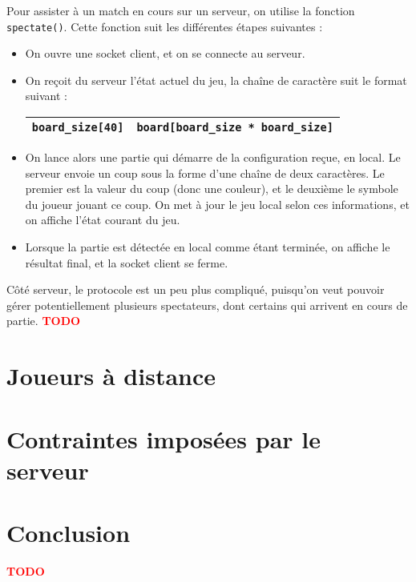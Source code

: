 \documentclass[a4paper]{article}
\newcommand{\TODO}{\textcolor{red}{\textbf{TODO}}}
\begin{document}
Pour assister à un match en cours sur un serveur, on utilise la fonction \texttt{spectate()}. Cette fonction suit les différentes étapes suivantes :

%
\begin{itemize}
	\setlength\itemsep{1em}
	\item On ouvre une socket client, et on se connecte au serveur.
	\item On reçoit du serveur l'état actuel du jeu, la chaîne de caractère suit le format suivant :

		\bgroup
		\def\arraystretch{1.5}
		\begin{center}
		\begin{tabular}{|c|c|}
			\hline 
			\texttt{board\_size[40]} & \texttt{board[board\_size * board\_size]} \\ 
			\hline 
		\end{tabular} 	
		\end{center}
		\egroup
	
	\item On lance alors une partie qui démarre de la configuration reçue, en local. Le serveur envoie un coup sous la forme d'une chaîne de deux caractères. Le premier est la valeur du coup (donc une couleur), et le deuxième le symbole du joueur jouant ce coup. On met à jour le jeu local selon ces informations, et on affiche l'état courant du jeu. 
	\item Lorsque la partie est détectée en local comme étant terminée, on affiche le résultat final, et la socket client se ferme. \\

\end{itemize}
%


Côté serveur, le protocole est un peu plus compliqué, puisqu'on veut pouvoir gérer potentiellement plusieurs spectateurs, dont certains qui arrivent en cours de partie.
\TODO


\section{Joueurs à distance}


\section{Contraintes imposées par le serveur}


\section*{Conclusion}

\TODO


 

\end{document}
